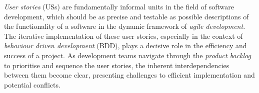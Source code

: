 %
%
%
%
%
\emph{User stories} (USs) are fundamentally informal units in the field of software development, which should be as precise and testable as possible descriptions of the functionality of a software in the dynamic framework of \emph{agile development}. The iterative implementation of these user stories, especially in the context of \emph{behaviour driven development} (BDD), plays a decisive role in the efficiency and success of a project\cite{mosser2022modelling}. As development teams navigate through the \emph{product backlog} to prioritise and sequence the user stories, the inherent interdependencies between them become clear, presenting challenges to efficient implementation and potential conflicts.

